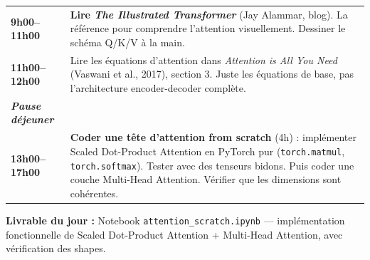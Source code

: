 \documentclass[a4paper,11pt]{article}
\begin{document}
\vspace{0.5cm}

\begin{tcolorbox}[daybox, title={Jeudi — Mécanisme d'attention from scratch (7h)}]
\renewcommand{\arraystretch}{1.4}
\begin{tabularx}{\textwidth}{>{\bfseries\color{jepaBlue}}p{2.2cm} X}
  9h00–11h00  & \textbf{Lire \textit{The Illustrated Transformer}} (Jay Alammar, blog). La référence pour comprendre l'attention visuellement. Dessiner le schéma Q/K/V à la main. \\
  11h00–12h00 & Lire les équations d'attention dans \textit{Attention is All You Need} (Vaswani et al., 2017), section 3. Juste les équations de base, pas l'architecture encoder-decoder complète. \\
  \textit{Pause déjeuner} & \\
  13h00–17h00 & \textbf{Coder une tête d'attention from scratch} (4h) : implémenter Scaled Dot-Product Attention en PyTorch pur (\texttt{torch.matmul}, \texttt{torch.softmax}). Tester avec des tenseurs bidons. Puis coder une couche Multi-Head Attention. Vérifier que les dimensions sont cohérentes. \\
\end{tabularx}

\vspace{0.3cm}
\textbf{\color{successGreen} Livrable du jour :} Notebook \texttt{attention\_scratch.ipynb} — implémentation fonctionnelle de Scaled Dot-Product Attention + Multi-Head Attention, avec vérification des shapes.
\end{tcolorbox}

\vspace{0.5cm}
\end{document}
